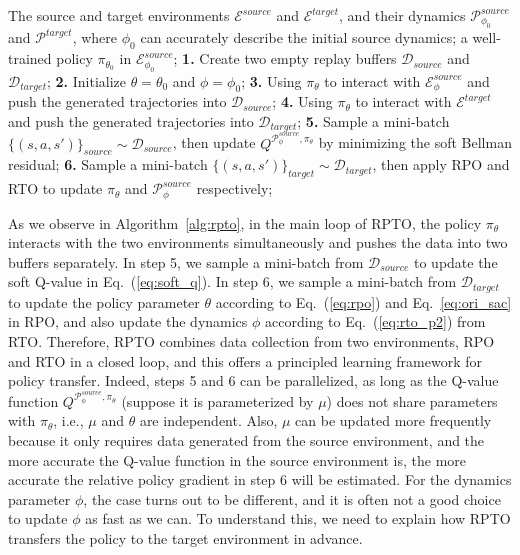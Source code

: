 \documentclass[letterpaper]{article} %
\def\P{{\mathcal{P}}}
\begin{document}
\begin{algorithm}[tb]
   \caption{Relative Policy-Transition Optimization.}
   \label{alg:rpto}
\begin{algorithmic}
    The source and target environments $\mathcal{E}^{source}$ and $\mathcal{E}^{target}$, and their dynamics $\P_{\phi_0}^{source}$ and $\P^{target}$, where $\phi_0$ can accurately describe the initial source dynamics; a well-trained policy $\pi_{\theta_0}$ in $\mathcal{E}_{\phi_0}^{source}$;
   \STATE \textbf{1.} Create two empty replay buffers $\mathcal{D}_{source}$ and $\mathcal{D}_{target}$;
   \STATE \textbf{2.} Initialize $\theta=\theta_0$ and $\phi=\phi_0$;
   \REPEAT
   \STATE \textbf{3.} Using $\pi_{\theta}$ to interact with $\mathcal{E}_{\phi}^{source}$ and push the generated trajectories into $\mathcal{D}_{source}$;
   \STATE \textbf{4.} Using $\pi_{\theta}$ to interact with $\mathcal{E}^{target}$ and push the generated trajectories into $\mathcal{D}_{target}$;
   \STATE \textbf{5.} Sample a mini-batch $\{(s,a,s')\}_{source}\sim\mathcal{D}_{source}$, then update $Q^{\P_{\phi}^{source},\pi_{\theta}}$ by minimizing the soft Bellman residual;
   \STATE \textbf{6.} Sample a mini-batch $\{(s,a,s')\}_{target}\sim\mathcal{D}_{target}$, then apply RPO and RTO to update $\pi_{\theta}$ and $\P_{\phi}^{source}$ respectively;
\end{algorithmic}
\end{algorithm}




As we observe in Algorithm~\ref{alg:rpto}, in the main loop of RPTO, the policy $\pi_{\theta}$ interacts with the two environments simultaneously and pushes the data into two buffers separately. In step 5, we sample a mini-batch from $\mathcal{D}_{source}$ to update the soft Q-value in Eq.~(\ref{eq:soft_q}). In step 6, we sample a mini-batch from $\mathcal{D}_{target}$ to update the policy parameter $\theta$ according to Eq.~(\ref{eq:rpo}) and Eq.~\eqref{eq:ori_sac} in RPO, and also update the dynamics $\phi$ according to Eq.~(\ref{eq:rto_p2}) from RTO. Therefore, RPTO combines data collection from two environments, RPO and RTO in a closed loop, and this offers a principled learning framework for policy transfer. Indeed, steps 5 and 6 can be parallelized, as long as the Q-value function $Q^{\P_{\phi}^{source},\pi_{\theta}}$ (suppose it is parameterized by $\mu$) does not share parameters with $\pi_{\theta}$, i.e., $\mu$ and $\theta$ are independent. Also, $\mu$ can be updated more frequently because it only requires data generated from the source environment, and the more accurate the Q-value function in the source environment is, the more accurate the relative policy gradient in step 6 will be estimated. 
For the dynamics parameter $\phi$, the case turns out to be different, and it is often not a good choice to update $\phi$ as fast as we can. To understand this, we need to explain how RPTO transfers the policy to the target environment in advance. 
\end{document}
